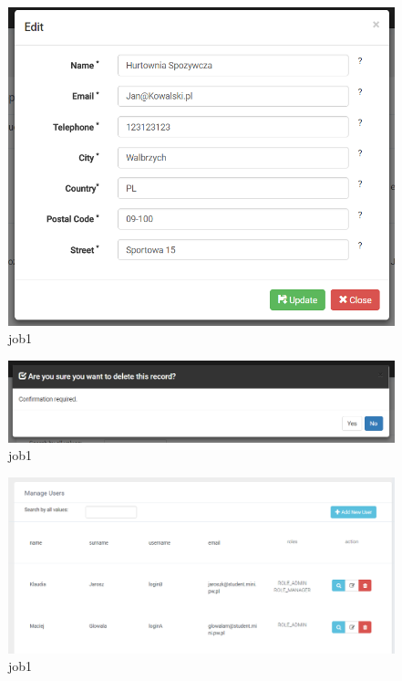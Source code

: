 \documentclass[a4paper,11pt,twoside]{report}
\theoremstyle{definition}
\begin{document}
\begin{figure}[h!]
\begin{center}
\includegraphics[width=\textwidth]{AS/supplier/4}
\end{center}
\caption{job1}
\end{figure}
\thispagestyle{empty}


\begin{figure}[h!]
\begin{center}
\includegraphics[width=\textwidth]{AS/supplier/5}
\end{center}
\caption{job1}
\end{figure}
\thispagestyle{empty}


\begin{figure}[h!]
\begin{center}
\includegraphics[width=\textwidth]{AS/users/1}
\end{center}
\caption{job1}
\end{figure}
\thispagestyle{empty}
\end{document}
